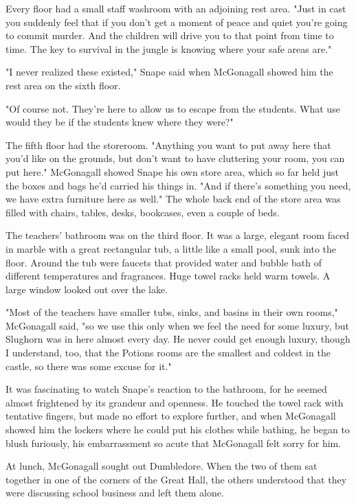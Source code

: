 Every floor had a small staff washroom with an adjoining rest area. "Just in cast you suddenly feel that if you don't get a moment of peace and quiet you're going to commit murder. And the children will drive you to that point from time to time. The key to survival in the jungle is knowing where your safe areas are."

"I never realized these existed," Snape said when McGonagall showed him the rest area on the sixth floor.

"Of course not. They're here to allow us to escape from the students. What use would they be if the students knew where they were?"

The fifth floor had the storeroom. "Anything you want to put away here that you'd like on the grounds, but don't want to have cluttering your room, you can put here." McGonagall showed Snape his own store area, which so far held just the boxes and bags he'd carried his things in. "And if there's something you need, we have extra furniture here as well." The whole back end of the store area was filled with chairs, tables, desks, bookcases, even a couple of beds.

The teachers' bathroom was on the third floor. It was a large, elegant room faced in marble with a great rectangular tub, a little like a small pool, sunk into the floor. Around the tub were faucets that provided water and bubble bath of different temperatures and fragrances. Huge towel racks held warm towels. A large window looked out over the lake.

"Most of the teachers have smaller tubs, sinks, and basins in their own rooms," McGonagall said, "so we use this only when we feel the need for some luxury, but Slughorn was in here almost every day. He never could get enough luxury, though I understand, too, that the Potions rooms are the smallest and coldest in the castle, so there was some excuse for it."

It was fascinating to watch Snape's reaction to the bathroom, for he seemed almost frightened by its grandeur and openness. He touched the towel rack with tentative fingers, but made no effort to explore further, and when McGonagall showed him the lockers where he could put his clothes while bathing, he began to blush furiously, his embarrassment so acute that McGonagall felt sorry for him.

At lunch, McGonagall sought out Dumbledore. When the two of them sat together in one of the corners of the Great Hall, the others understood that they were discussing school business and left them alone.

